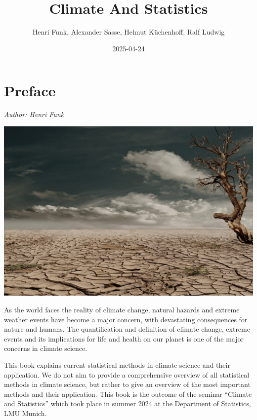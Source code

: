 \documentclass[
]{krantz}
\title{Climate And Statistics}
\author{Henri Funk, Alexander Sasse, Helmut Küchenhoff, Ralf Ludwig}
\date{2025-04-24}
\begin{document}
\maketitle


\thispagestyle{empty}

\begin{center}
\end{center}

\setlength{\abovedisplayskip}{-5pt}
\setlength{\abovedisplayshortskip}{-5pt}

{
\hypersetup{linkcolor=}
\setcounter{tocdepth}{0}
\tableofcontents
}
\chapter*{Preface}\label{preface}


\emph{Author: Henri Funk}

\begin{center}\includegraphics[width=0.75\linewidth]{cover} \end{center}

As the world faces the reality of climate change, natural hazards and extreme weather events have become a major concern, with devastating consequences for nature and humans. The quantification and definition of climate change, extreme events and its implications for life and health on our planet is one of the major concerns in climate science.

This book explains current statistical methods in climate science and their application.
We do not aim to provide a comprehensive overview of all statistical methods in climate science, but rather to give an overview of the most important methods and their application.
This book is the outcome of the seminar ``Climate and Statistics'' which took place in summer 2024 at the Department of Statistics, LMU Munich.
\end{document}
